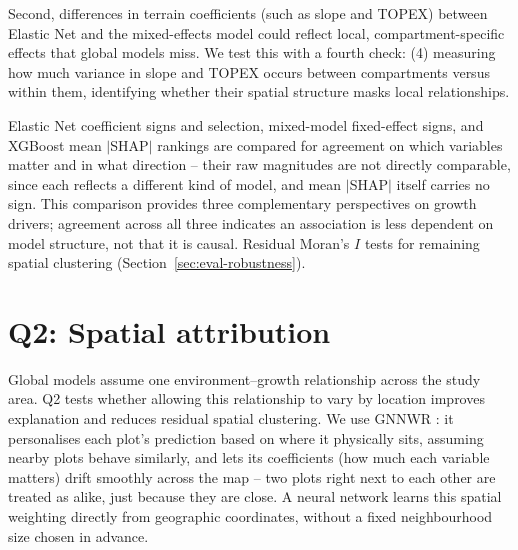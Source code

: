 Second, differences in terrain coefficients (such as slope and TOPEX) between Elastic Net and the mixed-effects model could reflect local, compartment-specific effects that global models miss. We test this with a fourth check: (4) measuring how much variance in slope and TOPEX occurs between compartments versus within them, identifying whether their spatial structure masks local relationships.

Elastic Net coefficient signs and selection, mixed-model fixed-effect signs, and XGBoost mean $|$SHAP$|$ rankings are compared for agreement on which variables matter and in what direction -- their raw magnitudes are not directly comparable, since each reflects a different kind of model, and mean $|$SHAP$|$ itself carries no sign. This comparison provides three complementary perspectives on growth drivers; agreement across all three indicates an association is less dependent on model structure, not that it is causal. Residual Moran's $I$ tests for remaining spatial clustering (Section~\ref{sec:eval-robustness}).


\section{Q2: Spatial attribution}
Global models assume one environment--growth relationship across the study area. Q2 tests whether allowing this relationship to vary by location improves explanation and reduces residual spatial clustering. We use GNNWR \cite{du2020Geographically_C6_GWR}: it personalises each plot's prediction based on where it physically sits, assuming nearby plots behave similarly, and lets its coefficients (how much each variable matters) drift smoothly across the map -- two plots right next to each other are treated as alike, just because they are close. A neural network learns this spatial weighting directly from geographic coordinates, without a fixed neighbourhood size chosen in advance.

